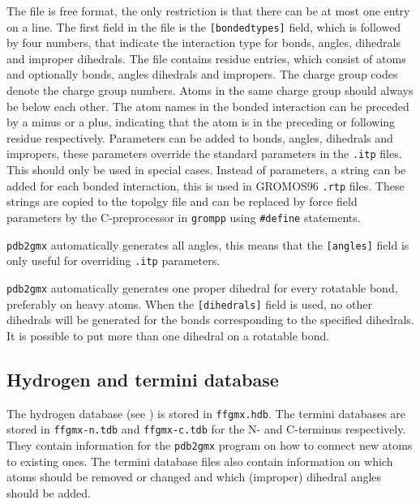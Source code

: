 The file is free format, the only restriction is that there can be at most
one entry on a line.
The first field in the file is the {\tt [bondedtypes]} field, which is
followed by four numbers, that indicate the interaction type for bonds,
angles, dihedrals and improper dihedrals.
The file contains residue entries, which consist of atoms and optionally 
bonds, angles dihedrals and impropers.
The charge group codes denote the charge group numbers.
Atoms in the same charge group should always be below each other.
The atom names in the bonded interaction can be preceded by a minus
or a plus, indicating that the atom is in the preceding or following
residue respectively.
Parameters can be added to bonds, angles, dihedrals and impropers,
these parameters override the standard parameters in the {\tt .itp} files.
This should only be used in special cases. Instead of parameters, a
string can be added for each bonded interaction, this is used in
GROMOS96 {\tt .rtp} files. These strings are copied to the topolgy file
and can be replaced by force field parameters by the C-preprocessor in
{\tt grompp} using {\tt \#define} statements.

{\tt pdb2gmx} automatically generates all angles, this means that the
{\tt [angles]} field is only useful for overriding {\tt .itp} parameters. 

{\tt pdb2gmx} automatically generates one proper dihedral for every rotatable
bond, preferably on heavy atoms. When the {\tt [dihedrals]} field is used,
no other dihedrals will be generated for the bonds corresponding to the
specified  dihedrals. It is possible to put more than one dihedral on a
rotatable bond. 

\subsection{Hydrogen and termini database}
The hydrogen database (see ) is stored in {\tt ffgmx.hdb}. The termini
databases are stored in {\tt ffgmx-n.tdb} and {\tt ffgmx-c.tdb} for the
N- and C-terminus respectively. They contain information for the {\tt pdb2gmx}
program on how to connect new atoms to existing ones. The termini
database files also contain information on which atoms should be
removed or changed and which (improper) dihedral angles should be
added.

